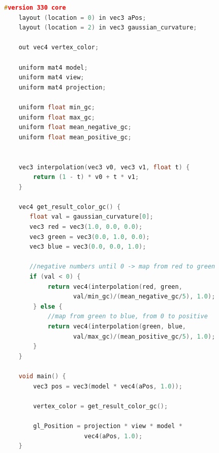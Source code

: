 \begin{lstlisting}[language=C++,
    directivestyle={\color{black}}
    emph={int,char,double,float,unsigned},
    emphstyle={\color{blue}}
   ]
    #version 330 core
    layout (location = 0) in vec3 aPos;
    layout (location = 2) in vec3 gaussian_curvature;

    out vec4 vertex_color;

    uniform mat4 model;
    uniform mat4 view;
    uniform mat4 projection;

    uniform float min_gc;
    uniform float max_gc;
    uniform float mean_negative_gc;
    uniform float mean_positive_gc;


    vec3 interpolation(vec3 v0, vec3 v1, float t) {
        return (1 - t) * v0 + t * v1;
    }

    vec4 get_result_color_gc() {
       float val = gaussian_curvature[0];
       vec3 red = vec3(1.0, 0.0, 0.0);
       vec3 green = vec3(0.0, 1.0, 0.0);
       vec3 blue = vec3(0.0, 0.0, 1.0);

       //negative numbers until 0 -> map from red to green
       if (val < 0) {
            return vec4(interpolation(red, green,
                   val/min_gc)/(mean_negative_gc/5), 1.0);
        } else {
            //map from green to blue, from 0 to positive
            return vec4(interpolation(green, blue,
                   val/max_gc)/(mean_positive_gc/5), 1.0);
        }
    }

    void main() {
        vec3 pos = vec3(model * vec4(aPos, 1.0));

        vertex_color = get_result_color_gc();

        gl_Position = projection * view * model *
                      vec4(aPos, 1.0);
    }
\end{lstlisting}

